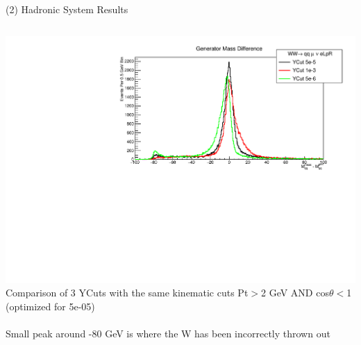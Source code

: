 \documentclass[10pt]{beamer}
\begin{document}
\begin{frame}{(2) Hadronic System Results}

\begin{columns}
\begin{column}{0.5\textwidth}
   	\includegraphics[scale=0.3, left]{SupDiff.pdf}\\
   	\scriptsize
   	Comparison of 3 YCuts with the same kinematic cuts Pt$>$2 GeV AND cos$\theta<$1 (optimized for 5e-05)\\
   	\quad \quad \\
   	Small peak around -80 GeV is where the W has been incorrectly thrown out\\
   	\quad \quad \\
   	

\end{column}
\end{columns}
\end{frame}
\end{document}
